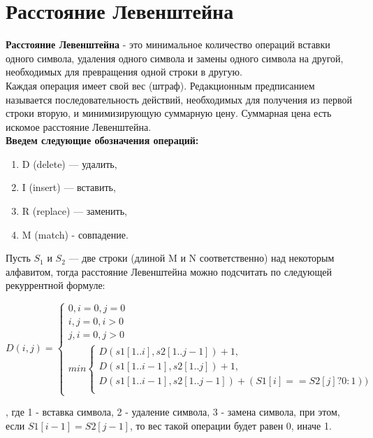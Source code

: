 \documentclass[a4paper,12pt]{report}
\begin{document}
\section{Расстояние Левенштейна}
\hspace{0.6cm}\textbf {Расстояние Левенштейна} - это минимальное количество операций вставки одного символа, удаления одного символа и замены одного символа на другой, необходимых для превращения одной строки в другую.\\
    
Каждая операция имеет свой вес (штраф). Редакционным предписанием называется последовательность действий, необходимых для получения из первой строки вторую, и минимизирующую суммарную цену. Суммарная цена есть искомое расстояние Левенштейна.\\
 
\textbf{Введем следующие обозначения операций:} 
\begin{enumerate}
  	\item D (delete) — удалить,
	\item I (insert) — вставить,
	\item R (replace) — заменить,
	\item M (match) - совпадение.
\end{enumerate}

Пусть $S_{1}$ и $S_{2}$ — две строки (длиной M и N соответственно) над некоторым алфавитом, тогда расстояние Левенштейна можно подсчитать по следующей рекуррентной формуле:

\begin{displaymath}
D(i,j) = \left\{ \begin{array}{ll}
 0,  \textrm{$i = 0, j = 0$}\\
 i,  \textrm{$j = 0, i > 0$}\\
 j,  \textrm{$i = 0, j > 0$}\\
min\left\{ \begin{array}{ll}
D(s1[1..i],s2[1..j-1]) + 1,\\
D(s1[1..i-1],s2[1..j]) + 1,\\
D(s1[1..i-1],s2[1..j-1]) + (S1[i] == S2[j] ? 0 : 1))\\
\end{array} \right.
  \end{array} \right.
\end{displaymath}

, где 1 - вставка символа, 2 - удаление символа, 3 - замена символа, при этом, если $S1[i - 1] = S2[j - 1]$, то вес такой операции будет равен 0, иначе 1.
\end{document}
